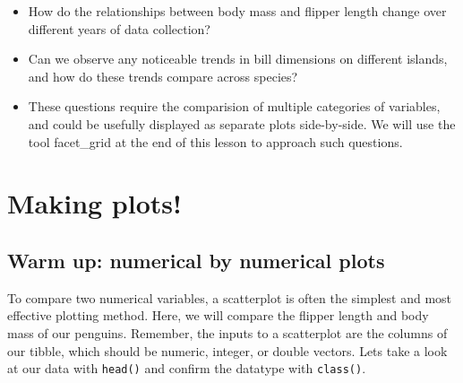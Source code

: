 \documentclass[
  letterpaper,
  DIV=11,
  numbers=noendperiod]{scrreprt}
\newenvironment{Shaded}{\begin{snugshade}}{\end{snugshade}}
\newcommand{\FunctionTok}[1]{\textcolor[rgb]{0.28,0.35,0.67}{#1}}
\newcommand{\NormalTok}[1]{\textcolor[rgb]{0.00,0.23,0.31}{#1}}
\newcommand{\SpecialCharTok}[1]{\textcolor[rgb]{0.37,0.37,0.37}{#1}}
\begin{document}
\begin{tcolorbox}[enhanced jigsaw, bottomtitle=1mm, bottomrule=.15mm, toprule=.15mm, opacityback=0, leftrule=.75mm, breakable, colback=white, toptitle=1mm, left=2mm, coltitle=black, titlerule=0mm, opacitybacktitle=0.6, title=\textcolor{quarto-callout-note-color}{\faInfo}\hspace{0.5em}{Questions related to multiple categorical variables}, rightrule=.15mm, arc=.35mm, colframe=quarto-callout-note-color-frame, colbacktitle=quarto-callout-note-color!10!white]

\begin{itemize}
\item
  How do the relationships between body mass and flipper length change
  over different years of data collection?
\item
  Can we observe any noticeable trends in bill dimensions on different
  islands, and how do these trends compare across species?
\item
  These questions require the comparision of multiple categories of
  variables, and could be usefully displayed as separate plots
  side-by-side. We will use the tool facet\_grid at the end of this
  lesson to approach such questions.
\end{itemize}

\end{tcolorbox}

\section{Making plots!}\label{making-plots}

\subsection{Warm up: numerical by numerical
plots}\label{warm-up-numerical-by-numerical-plots}

To compare two numerical variables, a scatterplot is often the simplest
and most effective plotting method. Here, we will compare the flipper
length and body mass of our penguins. Remember, the inputs to a
scatterplot are the columns of our tibble, which should be numeric,
integer, or double vectors. Lets take a look at our data with
\texttt{head()} and confirm the datatype with \texttt{class()}.

\begin{Shaded}
\end{Shaded}
\end{document}
